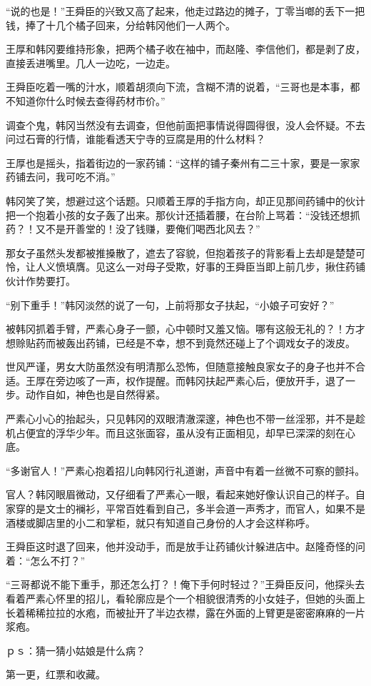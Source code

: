 “说的也是！”王舜臣的兴致又高了起来，他走过路边的摊子，丁零当啷的丢下一把钱，捧了十几个橘子回来，分给韩冈他们一人两个。

王厚和韩冈要维持形象，把两个橘子收在袖中，而赵隆、李信他们，都是剥了皮，直接丢进嘴里。几人一边吃，一边走。

王舜臣吃着一嘴的汁水，顺着胡须向下流，含糊不清的说着，“三哥也是本事，都不知道你什么时候去查得药材市价。”

调查个鬼，韩冈当然没有去调查，但他前面把事情说得圆得很，没人会怀疑。不去问过石膏的行情，谁能看透天宁寺的豆腐是用的什么材料？

王厚也是摇头，指着街边的一家药铺：“这样的铺子秦州有二三十家，要是一家家药铺去问，我可吃不消。”

韩冈笑了笑，想避过这个话题。只顺着王厚的手指方向，却正见那间药铺中的伙计把一个抱着小孩的女子轰了出来。那伙计还插着腰，在台阶上骂着：“没钱还想抓药？！又不是开善堂的！没了钱赚，要俺们喝西北风去？”

那女子虽然头发都被推搡散了，遮去了容貌，但抱着孩子的背影看上去却是楚楚可怜，让人义愤填膺。见这么一对母子受欺，好事的王舜臣当即上前几步，揪住药铺伙计作势要打。

“别下重手！”韩冈淡然的说了一句，上前将那女子扶起，“小娘子可安好？”

被韩冈抓着手臂，严素心身子一颤，心中顿时又羞又恼。哪有这般无礼的？！方才想赊贴药而被轰出药铺，已经是不幸，想不到竟然还碰上了个调戏女子的泼皮。

世风严谨，男女大防虽然没有明清那么恐怖，但随意接触良家女子的身子也并不合适。王厚在旁边咳了一声，权作提醒。而韩冈扶起严素心后，便放开手，退了一步。动作自如，神色也是自然得紧。

严素心小心的抬起头，只见韩冈的双眼清澈深邃，神色也不带一丝淫邪，并不是趁机占便宜的浮华少年。而且这张面容，虽从没有正面相见，却早已深深的刻在心底。

“多谢官人！”严素心抱着招儿向韩冈行礼道谢，声音中有着一丝微不可察的颤抖。

官人？韩冈眼眉微动，又仔细看了严素心一眼，看起来她好像认识自己的样子。自家穿的是文士的襕衫，平常百姓看到自己，多半会道一声秀才，而官人，如果不是酒楼或脚店里的小二和掌柜，就只有知道自己身份的人才会这样称呼。

王舜臣这时退了回来，他并没动手，而是放手让药铺伙计躲进店中。赵隆奇怪的问着：“怎么不打？”

“三哥都说不能下重手，那还怎么打？！俺下手何时轻过？”王舜臣反问，他探头去看着严素心怀里的招儿，看轮廓应是个一个相貌很清秀的小女娃子，但她的头面上长着稀稀拉拉的水疱，而被扯开了半边衣襟，露在外面的上臂更是密密麻麻的一片浆疱。

ｐｓ：猜一猜小姑娘是什么病？

第一更，红票和收藏。

